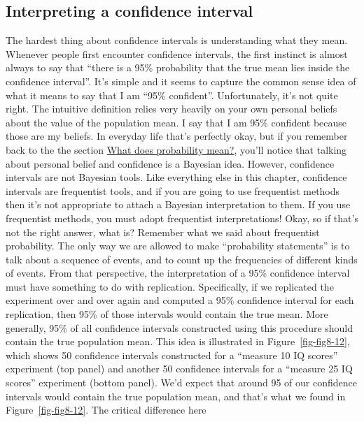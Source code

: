 \documentclass[
  a4paper,
]{book}
\begin{document}
\hypertarget{interpreting-a-confidence-interval}{%
\subsection{Interpreting a confidence
interval}\label{interpreting-a-confidence-interval}}

The hardest thing about confidence intervals is understanding what they
mean. Whenever people first encounter confidence intervals, the first
instinct is almost always to say that ``there is a 95\% probability that
the true mean lies inside the confidence interval''. It's simple and it
seems to capture the common sense idea of what it means to say that I am
``95\% confident''. Unfortunately, it's not quite right. The intuitive
definition relies very heavily on your own personal beliefs about the
value of the population mean. I say that I am 95\% confident because
those are my beliefs. In everyday life that's perfectly okay, but if you
remember back to the the section
\protect\hyperlink{what-does-probability-mean}{What does probability
mean?}, you'll notice that talking about personal belief and confidence
is a Bayesian idea. However, confidence intervals are not Bayesian
tools. Like everything else in this chapter, confidence intervals are
frequentist tools, and if you are going to use frequentist methods then
it's not appropriate to attach a Bayesian interpretation to them. If you
use frequentist methods, you must adopt frequentist interpretations!
Okay, so if that's not the right answer, what is? Remember what we said
about frequentist probability. The only way we are allowed to make
``probability statements'' is to talk about a sequence of events, and to
count up the frequencies of different kinds of events. From that
perspective, the interpretation of a 95\% confidence interval must have
something to do with replication. Specifically, if we replicated the
experiment over and over again and computed a 95\% confidence interval
for each replication, then 95\% of those intervals would contain the
true mean. More generally, 95\% of all confidence intervals constructed
using this procedure should contain the true population mean. This idea
is illustrated in Figure~\ref{fig-fig8-12}, which shows 50 confidence
intervals constructed for a ``measure 10 IQ scores'' experiment (top
panel) and another 50 confidence intervals for a ``measure 25 IQ
scores'' experiment (bottom panel). We'd expect that around 95 of our
confidence intervals would contain the true population mean, and that's
what we found in Figure~\ref{fig-fig8-12}. The critical difference here
\end{document}
